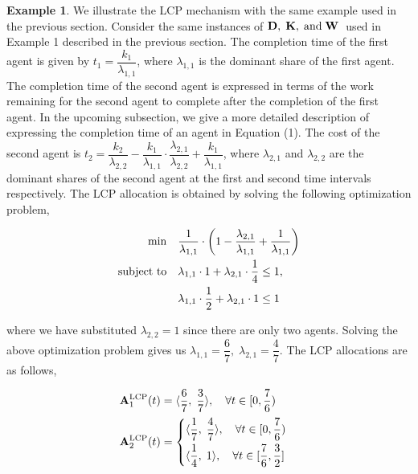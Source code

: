 \documentclass[letterpaper]{article} %
\theoremstyle{definition}
\newtheorem{example}{Example}
\begin{document}
\begin{example} \label{lcp-example}
We illustrate the LCP mechanism with the same example used in the previous section. Consider the same instances of $\mathbf{D}, \; \mathbf{K}, \; \textnormal{and} \; \mathbf{W}\;$ used in Example 1 described in the previous section. The completion time of the first agent is given by $t_{1} = \displaystyle \dfrac{k_{1}}{\lambda_{1,1}}$, where $\lambda_{1,1}$ is the dominant share of the first agent. The completion time of the second agent is expressed in terms of the work remaining for the second agent to complete after the completion of the first agent. In the upcoming subsection, we give a more detailed description of expressing the completion time of an agent in Equation (1). The cost of the second agent is $t_{2} = \displaystyle\dfrac{k_{2}}{\lambda_{2,2}} - \dfrac{k_{1}}{\lambda_{1,1}} \cdot \dfrac{\lambda_{2,1}}{\lambda_{2,2}} + \displaystyle \dfrac{k_{1}}{\lambda_{1,1}}$, where $\lambda_{2,1}$ and $\lambda_{2,2}$ are the dominant shares of the second agent at the first and second time intervals respectively.  The LCP allocation is obtained by solving the following optimization problem,
\begin{linenomath}
\begin{align*} 
\begin{split}
\min \quad & \dfrac{1}{\lambda_{1,1}} \cdot \left( 1 - \displaystyle \dfrac{\lambda_{2,1}}{\lambda_{1,1}} + \displaystyle \dfrac{1}{\lambda_{1,1}}\right)  
\\ \textnormal{subject to} \quad  & \lambda_{1,1} \cdot 1 + \lambda_{2,1} \cdot \dfrac{1}{4} \leq 1, \\ &  \lambda_{1,1} \cdot \dfrac{1}{2} + \lambda_{2,1} \cdot 1 \leq 1  
\end{split}
\end{align*}
\end{linenomath}

\noindent where we have substituted $\lambda_{2,2} = 1$ since there are only two agents. Solving the above optimization problem gives us $\lambda_{1,1} = \displaystyle \dfrac{6}{7}, \; \lambda_{2,1} = \displaystyle \dfrac{4}{7}$. The LCP allocations are as follows,
\begin{linenomath}
\begin{align*} 
\begin{split}
\mathbf{A}^{\textnormal{LCP}}_{1}(t) & = \langle \dfrac{6}{7}, \; \dfrac{3}{7} \rangle, \quad \forall t \in [0, \dfrac{7}{6}) \\[1.5 pt]
\mathbf{A}^{\textnormal{LCP}}_{2}(t) &  = \begin{cases}
\langle \dfrac{1}{7}, \; \dfrac{4}{7} \rangle, \quad \forall t \in [0, \dfrac{7}{6}) \\[6 pt]
\langle \dfrac{1}{4}, \; 1 \rangle, \quad \forall t \in [\dfrac{7}{6}, \dfrac{3}{2}] 
\end{cases}
\end{split}
\end{align*}
\end{linenomath}


\end{example}
\end{document}
